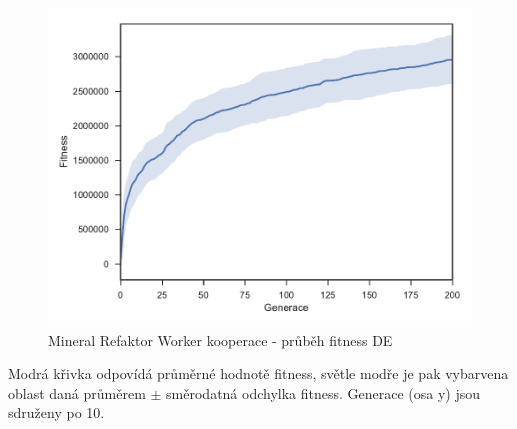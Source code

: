 \clearpage
\begin{figure}[h]\centering
	\includegraphics[width=\columnwidth]{../img/MineralMap/MineralWorkerRefaktorCoop}
	\caption{Mineral Refaktor Worker kooperace -  průběh fitness DE}
	\label{obr04:MineralRefactorWorkerCoop}
\end{figure}
Modrá křivka odpovídá průměrné hodnotě fitness, světle modře je pak vybarvena oblast daná průměrem $\pm$ směrodatná odchylka fitness. Generace (osa y) jsou sdruženy po 10. 
\clearpage
